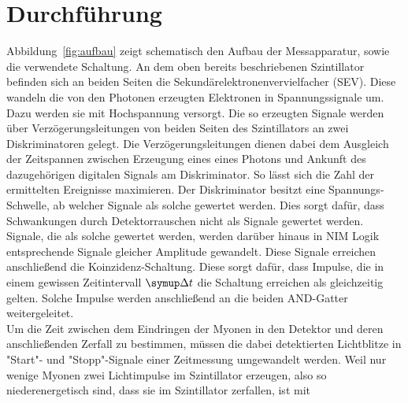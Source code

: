 \section{Durchführung}
\label{sec:durchführung}

Abbildung~\ref{fig:aufbau} zeigt schematisch den Aufbau der Messapparatur, sowie die verwendete Schaltung. An dem oben bereits beschriebenen Szintillator befinden sich an beiden Seiten die Sekundärelektronenvervielfacher (SEV).
Diese wandeln die von den Photonen erzeugten Elektronen in Spannungssignale um. Dazu werden sie mit Hochspannung versorgt. Die so erzeugten Signale werden über Verzögerungsleitungen von beiden Seiten des Szintillators an zwei Diskriminatoren gelegt.
Die Verzögerungsleitungen dienen dabei dem Ausgleich der Zeitspannen zwischen Erzeugung eines eines Photons und Ankunft des dazugehörigen digitalen Signals am Diskriminator.
So lässt sich die Zahl der ermittelten Ereignisse maximieren. Der Diskriminator besitzt eine Spannungs-Schwelle, ab welcher Signale als solche gewertet werden.
Dies sorgt dafür, dass Schwankungen durch Detektorrauschen nicht als Signale gewertet werden.
Signale, die als solche gewertet werden, werden darüber hinaus in NIM Logik entsprechende Signale gleicher Amplitude gewandelt.
Diese Signale erreichen anschließend die Koinzidenz-Schaltung. Diese sorgt dafür, dass Impulse, die in einem gewissen Zeitintervall $\upD t$ die Schaltung erreichen als gleichzeitig gelten. Solche Impulse werden anschließend an die beiden AND-Gatter weitergeleitet. \\
Um die Zeit zwischen dem Eindringen der Myonen in den Detektor und deren anschließenden Zerfall zu bestimmen, müssen die dabei detektierten
Lichtblitze in "Start"- und "Stopp"-Signale einer Zeitmessung umgewandelt werden.
Weil nur wenige Myonen zwei Lichtimpulse im Szintillator erzeugen, also so niederenergetisch sind, dass sie im Szintillator zerfallen, ist mit
